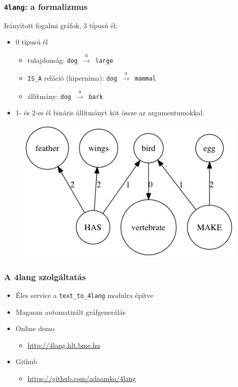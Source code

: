 \documentclass[bigger]{beamer}
\newcommand{\tefl}{\texttt{text\_to\_4lang}\xspace}
\newcommand{\fl}{\texttt{4lang}\xspace}
\begin{document}
{
	
	\begin{frame}
	\frametitle{\fl: a formalizmus \citep{Kornai:2010,Kornai:2015a}}
	\pause Irányított fogalmi gráfok, 3 típusú él:
	\begin{itemize}
		\pause \item 0 típusú él
		\begin{itemize}
			\pause \item tulajdonság: \texttt{dog}~$\xrightarrow0$~\texttt{large}
			\pause \item \texttt{IS\_A} reláció (hipernima): \texttt{dog}~$\xrightarrow0$~\texttt{mammal}
			\pause \item állítmány: \texttt{dog}~$\xrightarrow0$~\texttt{bark}
		\end{itemize}
		\pause \item 1- és 2-es él bináris állítmányt köt össze az argumentumokkal.
	\end{itemize}
	\pause \begin{figure}
		\centering
		\includegraphics[scale=0.4]{pics/bird.jpg}
	\end{figure}
\end{frame}
}
\begin{frame}
\frametitle{A 4lang szolgáltatás}
\begin{itemize}
\pause \item Éles service a \tefl modulra építve
\pause \item Magasan automatizált gráfgenerálás
\pause \item Online demo
\begin{itemize}
	\item \url{http://4lang.hlt.bme.hu}
\end{itemize}
\pause \item Github
\begin{itemize}
	\item \url{https://github.com/adaamko/4lang}
\end{itemize}
\end{itemize}

\end{frame}
\end{document}
